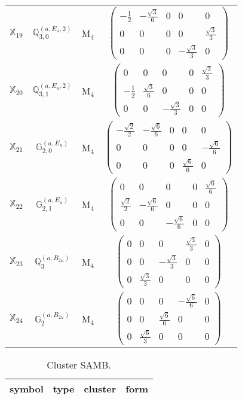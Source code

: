 \documentclass[fleqn,10pt,landscape]{article}
\begin{document}
\begin{itemize}
\begin{center}
\begin{longtable}{c|c|c|c}
$ \mathbb{X}_{19} $ & $\mathbb{Q}_{3,0}^{(a,E_{u},2)}$ & M$_{4}$ & $\begin{pmatrix} - \frac{1}{2} & - \frac{\sqrt{3}}{6} & 0 & 0 & 0 \\ 0 & 0 & 0 & 0 & \frac{\sqrt{3}}{3} \\ 0 & 0 & 0 & - \frac{\sqrt{3}}{3} & 0 \end{pmatrix}$ \\
$ \mathbb{X}_{20} $ & $\mathbb{Q}_{3,1}^{(a,E_{u},2)}$ & M$_{4}$ & $\begin{pmatrix} 0 & 0 & 0 & 0 & \frac{\sqrt{3}}{3} \\ - \frac{1}{2} & \frac{\sqrt{3}}{6} & 0 & 0 & 0 \\ 0 & 0 & - \frac{\sqrt{3}}{3} & 0 & 0 \end{pmatrix}$ \\
$ \mathbb{X}_{21} $ & $\mathbb{G}_{2,0}^{(a,E_{u})}$ & M$_{4}$ & $\begin{pmatrix} - \frac{\sqrt{2}}{2} & - \frac{\sqrt{6}}{6} & 0 & 0 & 0 \\ 0 & 0 & 0 & 0 & - \frac{\sqrt{6}}{6} \\ 0 & 0 & 0 & \frac{\sqrt{6}}{6} & 0 \end{pmatrix}$ \\
$ \mathbb{X}_{22} $ & $\mathbb{G}_{2,1}^{(a,E_{u})}$ & M$_{4}$ & $\begin{pmatrix} 0 & 0 & 0 & 0 & \frac{\sqrt{6}}{6} \\ \frac{\sqrt{2}}{2} & - \frac{\sqrt{6}}{6} & 0 & 0 & 0 \\ 0 & 0 & - \frac{\sqrt{6}}{6} & 0 & 0 \end{pmatrix}$ \\
$ \mathbb{X}_{23} $ & $\mathbb{Q}_{3}^{(a,B_{2u})}$ & M$_{4}$ & $\begin{pmatrix} 0 & 0 & 0 & \frac{\sqrt{3}}{3} & 0 \\ 0 & 0 & - \frac{\sqrt{3}}{3} & 0 & 0 \\ 0 & \frac{\sqrt{3}}{3} & 0 & 0 & 0 \end{pmatrix}$ \\
$ \mathbb{X}_{24} $ & $\mathbb{G}_{2}^{(a,B_{2u})}$ & M$_{4}$ & $\begin{pmatrix} 0 & 0 & 0 & - \frac{\sqrt{6}}{6} & 0 \\ 0 & 0 & \frac{\sqrt{6}}{6} & 0 & 0 \\ 0 & \frac{\sqrt{6}}{3} & 0 & 0 & 0 \end{pmatrix}$ \\
\end{longtable}
\end{center}
\begin{center}
\renewcommand{\arraystretch}{1.3}
\begin{longtable}{c|c|c|c}
\caption{Cluster SAMB.}
 \\
 \hline \hline
symbol & type & cluster & form \\ \hline \endfirsthead


\end{longtable}
\end{center}
\end{itemize}
\end{document}
